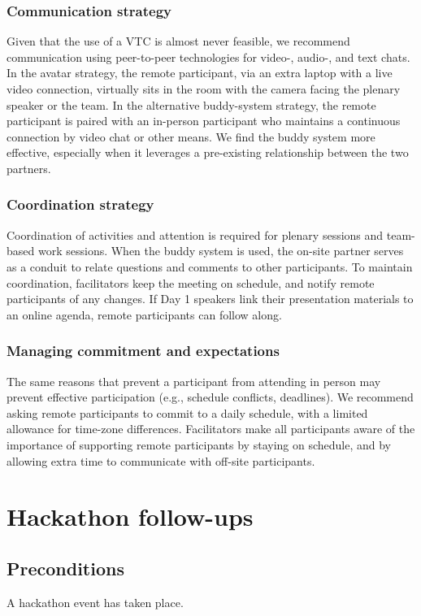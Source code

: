 \documentclass[letterpaper,11pt]{texMemo}
\begin{document}
\subsubsection*{Communication strategy} Given that the use of a VTC is almost never feasible, we recommend communication using peer-to-peer technologies for video-, audio-, and text chats. In the avatar strategy, the remote participant, via an extra laptop with a live video connection, virtually sits in the room with the camera facing the plenary speaker or the team. In the alternative buddy-system strategy, the remote participant is paired with an in-person participant who maintains a continuous connection by video chat or other means. We find the buddy system more effective, especially when it leverages a pre-existing relationship between the two partners.  
\subsubsection*{Coordination strategy} Coordination of activities and attention is required for plenary sessions and team-based work sessions. When the buddy system is used, the on-site partner serves as a conduit to relate questions and comments to other participants. To maintain coordination, facilitators keep the meeting on schedule, and notify remote participants of any changes. If Day 1 speakers link their presentation materials to an online agenda, remote participants can follow along.  
\subsubsection*{Managing commitment and expectations} The same reasons that prevent a participant from attending in person may prevent effective participation (e.g., schedule conflicts, deadlines). We recommend asking remote participants to commit to a daily schedule, with a limited allowance for time-zone differences. Facilitators make all participants aware of the importance of supporting remote participants by staying on schedule, and by allowing extra time to communicate with off-site participants.  

\newpage
\section{Hackathon follow-ups}
\subsection{Preconditions}
A hackathon event has taken place. 
\end{document}
